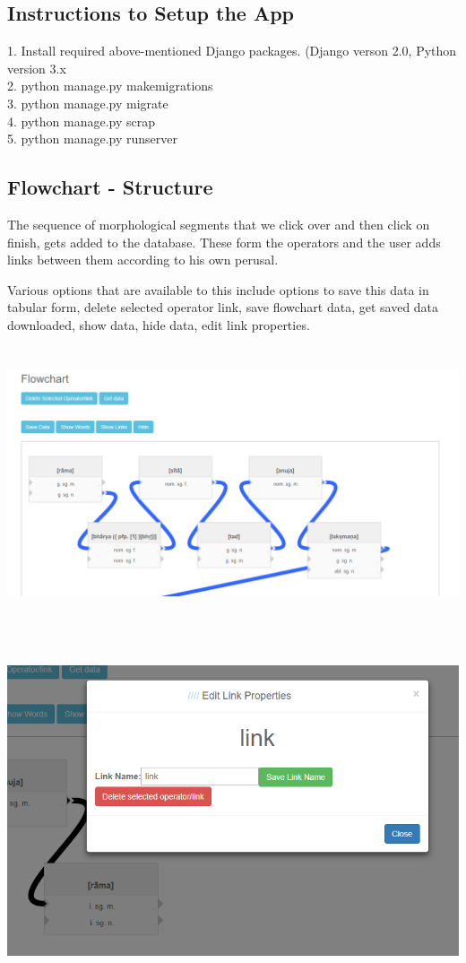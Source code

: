 \documentclass[12pt]{article}
\begin{document}
\subsection{Instructions to Setup the App}
1. Install required above-mentioned Django packages. (Django verson 2.0, Python version 3.x \\ 
2. python manage.py makemigrations \\
3. python manage.py migrate \\
4. python manage.py scrap \\
5. python manage.py runserver

\subsection{Flowchart - Structure}
The sequence of morphological segments that we click over and then click on finish, gets added to the database. These form the operators and the user adds links between them according to his own perusal. 

Various options that are available to this include options to save this data in tabular form, delete selected operator link, save flowchart data, get saved data downloaded, show data, hide data, edit link properties. 
\\ \\ \\
\includegraphics[width=150mm,scale=20]{capture1}

\\ \\ \\
\includegraphics[width=150mm,scale=20]{capture4}
\end{document}
